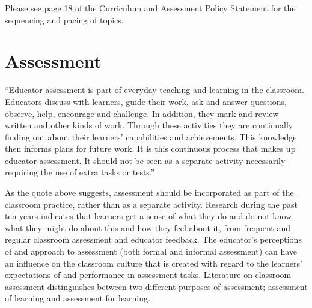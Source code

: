 Please see page 18 of the Curriculum and Assessment Policy Statement for the sequencing and pacing of topics.

\section{Assessment}
“Educator assessment is part of everyday teaching and learning in the classroom. Educators discuss with learners, guide their work, ask and answer questions, observe, help, encourage and challenge. In addition, they mark and review written and other kinds of work. Through these activities they are continually finding out about their learners’ capabilities and achievements. This knowledge then informs plans for future work. It is this continuous process that makes up educator assessment. It should not be seen as a separate activity necessarily requiring the use of extra tasks or tests.”  \par 

As the quote above suggests, assessment should be incorporated as part of the classroom practice, rather than as a separate activity. Research during the past ten years indicates that learners get a sense of what they do and do not know, what they might do about this and how they feel about it, from frequent and regular classroom assessment and educator feedback. The educator’s perceptions of and approach to assessment (both formal and informal assessment) can have an influence on the classroom culture that is created with regard to the learners’ expectations of and performance in assessment tasks. Literature on classroom assessment distinguishes between two different purposes of assessment; assessment of learning and assessment for learning. \par 

